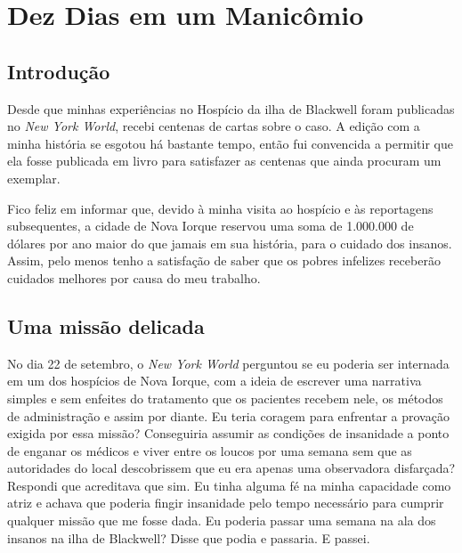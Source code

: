 

\part{Dez Dias em um Manicômio}




\chapter{Introdução}\label{introduuxe7uxe3o}

Desde que minhas experiências no Hospício da ilha de Blackwell foram
publicadas no \emph{New York World}, recebi centenas de cartas sobre o
caso. A edição com a minha história se esgotou há bastante tempo, então
fui convencida a permitir que ela fosse publicada em livro para
satisfazer as centenas que ainda procuram um exemplar.

Fico feliz em informar que, devido à minha visita ao hospício e às
reportagens subsequentes, a cidade de Nova Iorque reservou uma soma de
1.000.000 de dólares por ano maior do que jamais em sua história, para o
cuidado dos insanos. Assim, pelo menos tenho a satisfação de saber que
os pobres infelizes receberão cuidados melhores por causa do meu
trabalho.

\openany  



\chapter{Uma missão
delicada}\label{capuxedtulo-i-uma-missuxe3o-delicada}

No dia 22 de setembro, o \emph{New York World} perguntou se eu poderia ser
internada em um dos hospícios de Nova Iorque, com a ideia de escrever
uma narrativa simples e sem enfeites do tratamento que os pacientes
recebem nele, os métodos de administração e assim por diante. Eu teria
coragem para enfrentar a provação exigida por essa missão? Conseguiria
assumir as condições de insanidade a ponto de enganar os médicos e viver
entre os loucos por uma semana sem que as autoridades do local
descobrissem que eu era apenas uma observadora disfarçada? Respondi que
acreditava que sim. Eu tinha alguma fé na minha capacidade como atriz e
achava que poderia fingir insanidade pelo tempo necessário para cumprir
qualquer missão que me fosse dada. Eu poderia passar uma semana na ala
dos insanos na ilha de Blackwell? Disse que podia e passaria. E passei.

